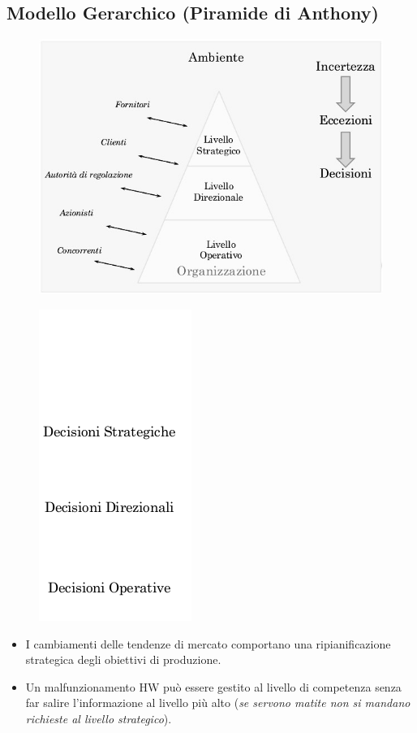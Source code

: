 \documentclass[a4paper, notitlepage, 9pt]{extreport}
\begin{document}
\subsection*{Modello Gerarchico (Piramide di Anthony)}
\begin{multicols}{2}
	\begin{figure}[H]
		\centering
		\includegraphics[scale=0.40]{Piramide1}
	\end{figure}
	\columnbreak
	\begin{figure}[H]
		\centering
		\includegraphics[scale=0.45]{Piramide2}
	\end{figure}
\end{multicols}
\begin{itemize}
	\item I cambiamenti delle tendenze di mercato comportano una ripianificazione strategica degli obiettivi di produzione.
	\item Un malfunzionamento HW può essere gestito al livello di competenza senza far salire l'informazione al livello più alto (\textit{\small{se servono matite non si mandano richieste al livello strategico}}).
\end{itemize}
\end{document}
